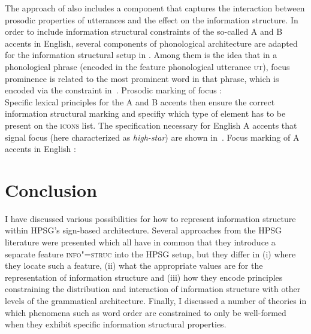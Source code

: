 \documentclass[output=paper
	        ,collection
	        ,collectionchapter
 	        ,biblatex
                ,babelshorthands
                ,newtxmath
                ,draftmode
                ,colorlinks, citecolor=brown
]{langscibook}
\begin{document}
The approach of \cite{song2018} also includes a component that
captures the interaction between prosodic properties of utterances and
the effect on the information structure. In order to include
information structural constraints of the so-called A and B accents in
English, several components of  phonological
architecture are adapted for the information structural setup in
\cite{song2018}. Among them is the idea that in a phonological phrase
(encoded in the feature phonological utterance \textsc{ut}), focus
prominence is related to the most prominent word in that phrase, which
is encoded via the constraint in~.
\ea
\label{ex:song-mkg}
Prosodic marking of focus \citep[159]{song2018}:\\
\z
Specific lexical principles for the A and B accents then ensure the
correct information structural marking and specifiy which type of
element has to be present on the \textsc{icons} list. The
specification necessary for English A accents that signal focus (here characterized as
\textit{high-star}) are shown
in~.
\ea
\label{ex:song-a-accent}
Focus marking of A accents in English \citep[160]{song2018}:\\
 \impl
{}
\z

\section{Conclusion}
\label{sec:conclusion}

I have discussed various possibilities for how to represent
information structure within HPSG's sign-based architecture.
Several approaches from the HPSG literature were presented which all
have in common that they introduce a separate feature
\textsc{info"=struc} into the HPSG setup, but they differ in (i) where
they locate such a feature, (ii) what the appropriate values are for
the representation of information structure and (iii) how they encode
principles constraining the distribution and interaction of
information structure with other levels of the grammatical
architecture. Finally, I discussed a number of theories in which
phenomena such as word order are constrained to only be well-formed
when they exhibit specific information structural properties.
\end{document}
